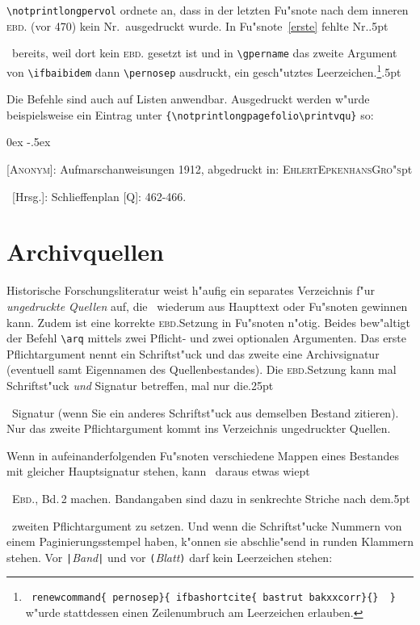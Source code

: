 \documentclass[12pt,a4paper]{article}
\newcommand{\pdfko}[1]{\kern #1pt
                          \strut\ignorespaces}%
\newcommand{\pbs}{\string\ \unskip}
\newcommand{\bs}{\protect\pbs}
\begin{document}
\noindent
\verb|\notprintlongpervol| ordnete an, dass in der letzten Fu"snote
nach dem inneren \textsc{ebd.} (vor {\footnotesize 470}) kein {\footnotesize Nr.}\ 
ausgedruckt wurde. In Fu"snote~\ref{erste} fehlte {\footnotesize Nr.}\pdfko{.5}\
bereits, weil dort kein \textsc{ebd.} gesetzt ist und
in \verb|\gpername| das zweite Argument von \verb|\ifbaibidem| dann 
\verb|\pernosep| ausdruckt, ein gesch"utztes Leerzeichen.\footnote{\label{pernosep2}
\texttt{\bs renewcommand\{\bs pernosep\}\{\bs ifbashortcite\{\bs bastrut\bs bakxxcorr\}\{\}\bs\ \}}
\\ w"urde stattdessen einen Zeilenumbruch am Leerzeichen erlauben.}\pdfko{.5}

\vspace{1ex}\noindent
Die Befehle sind auch auf Listen anwendbar. Ausgedruckt
werden w"urde beispielsweise ein Eintrag unter 
\verb|{\notprintlongpagefolio\printvqu}| so:

\vspace{-1ex}
{\footnotesize
\begin{description}\parsep 0ex \itemsep -.5ex
\item \textsc{[Anonym]}: Aufmarschanweisungen 1912, 
abgedruckt in: \textsc{Ehlert}\baslash \textsc{Epkenhans}\baslash \textsc{Gro"s}\pdfko{1}\
[Hrsg.]: Schlieffenplan [Q]: 462-466.
\end{description}}


\newpage
\section{Archivquellen}\label{Sect7}\label{archivquellen}

Historische Forschungsliteratur weist h"aufig ein separates Verzeichnis 
f"ur \textit{ungedruckte Quellen} auf, die \BibArts\ wiederum aus 
Haupttext oder Fu"snoten gewinnen kann. Zudem ist eine korrekte 
\textsc{ebd.}\hy Setzung in Fu"snoten n"otig. Beides bew"altigt der Befehl 
\verb|\arq| mittels zwei Pflicht- und zwei optionalen Argumenten. 
Das erste Pflichtargument nennt ein Schriftst"uck und das zweite eine 
Archivsignatur (eventuell samt Eigennamen des Quellenbestandes). Die 
\textsc{ebd.}\hy Setzung kann mal Schriftst"uck \textit{und} Signatur betreffen, 
mal nur die\pdfko{.25}\ 
Signatur (wenn Sie ein anderes Schriftst"uck aus demselben 
Bestand zitieren). Nur das zweite Pflichtargument kommt ins Verzeichnis 
ungedruckter Quellen.

Wenn in aufeinanderfolgenden Fu"snoten verschiedene Mappen eines 
Bestandes mit gleicher Hauptsignatur stehen, kann \BibArts\ daraus etwas 
wie\pdfko{1}\ 
{\footnotesize\textsc{Ebd.}, Bd.\,2} machen. Bandangaben sind dazu in 
senkrechte Striche nach dem\pdfko{.5}\  
zweiten Pflichtargument zu setzen. Und wenn die Schriftst"ucke Nummern von 
einem Paginierungsstempel haben, k"onnen sie abschlie"send in 
runden Klammern stehen. Vor {\small\verb+|+\textit{Band}\verb+|+} und 
vor {\small\verb+(+\textit{Blatt}\verb+)+} darf kein Leerzeichen stehen:
\end{document}
